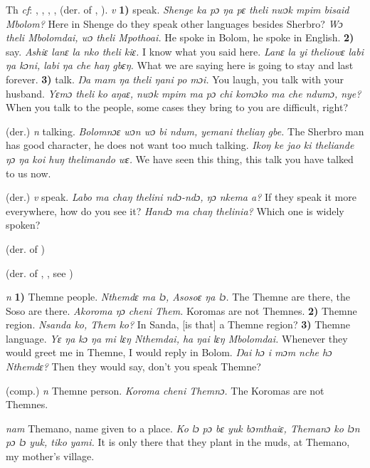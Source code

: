 \begin{letter}{Th}
 \textit{cf}: , , , ,  (der. of , ). \textit{v} \textbf{1)} speak. \textit{Shenge ka pɔ ŋa pɛ theli nwɔk mpim bisaid Mbolom?} Here in Shenge do they speak other languages besides Sherbro? \textit{Wɔ theli Mbolomdai, wɔ theli Mpothoai.} He spoke in Bolom, he spoke in English. \textbf{2)} say. \textit{Ashiɛ lanɛ la nko theli kiɛ.} I know what you said here. \textit{Lanɛ la yi theliowɛ labi ŋa kɔni, labi ŋa che haŋ gbɛŋ.} What we are saying here is going to stay and last forever. \textbf{3)} talk. \textit{Ŋa mam ŋa theli ŋani po mɔi.} You laugh, you talk with your husband. \textit{Yɛmɔ theli ko aŋaɛ, nwɔk mpim ma pɔ chi komɔko ma che ndumɔ, nye?} When you talk to the people, some cases they bring to you are difficult, right?

 (der.) \textit{n} talking. \textit{Bolomnɔɛ wɔn wɔ bi ndum, yemani theliaŋ gbe.} The Sherbro man has good character, he does not want too much talking. \textit{Ikoŋ ke jao ki theliande ŋɔ ŋa koi huŋ thelimando wɛ.} We have seen this thing, this talk you have talked to us now.

 (der.) \textit{v} speak. \textit{Labo ma chaŋ thelini ndɔ-ndɔ, ŋɔ nkema a?} If they speak it more everywhere, how do you see it? \textit{Handɔ ma chaŋ thelinia?} Which one is widely spoken?

 (der. of ) 

 (der. of , , see ) 

 \textit{n} \textbf{1)} Themne people. \textit{Nthemdɛ ma lɔ, Asosoɛ ŋa lɔ.} The Themne are there, the Soso are there. \textit{Akoroma ŋɔ cheni Them.} Koromas are not Themnes. \textbf{2)} Themne region. \textit{Nsanda ko, Them ko?} In Sanda, [is that] a Themne region? \textbf{3)} Themne language. \textit{Yɛ ŋa kɔ ŋa mi lɛŋ Nthemdai, ha ŋai lɛŋ Mbolomdai.} Whenever they would greet me in Themne, I would reply in Bolom. \textit{Ŋai hɔ i mɔm nche hɔ Nthemdɛ?} Then they would say, don't you speak Themne?

 (comp.) \textit{n} Themne person. \textit{Koroma cheni Themnɔ.} The Koromas are not Themnes.

 \textit{nam} Themano, name given to a place. \textit{Ko lɔ pɔ bɛ yuk bɔmthaiɛ, Themanɔ ko lɔn pɔ lɔ yuk, tiko yami.} It is only there that they plant in the muds, at Themano, my mother's village.


\end{letter}
